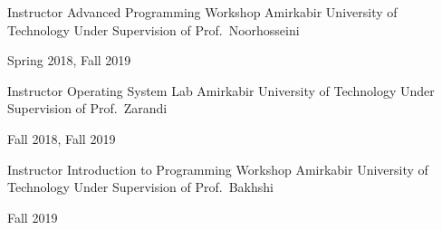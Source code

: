 \begin{cventries}
  \cventry%
    {Instructor} %
    {Advanced Programming Workshop} %
    {Amirkabir University of Technology} %
    {Under Supervision of Prof.\ Noorhosseini} %
    {%
      \begin{cvitems} %
        Spring 2018, Fall 2019
      \end{cvitems}
    }

  \cventry%
    {Instructor} %
    {Operating System Lab} %
    {Amirkabir University of Technology} %
    {Under Supervision of Prof.\ Zarandi} %
    {%
      \begin{cvitems} %
        Fall 2018, Fall 2019
      \end{cvitems}
    }

  \cventry%
    {Instructor} %
    {Introduction to Programming Workshop} %
    {Amirkabir University of Technology} %
    {Under Supervision of Prof.\ Bakhshi} %
    {%
      \begin{cvitems} %
        Fall 2019
      \end{cvitems}
    }

\end{cventries}

